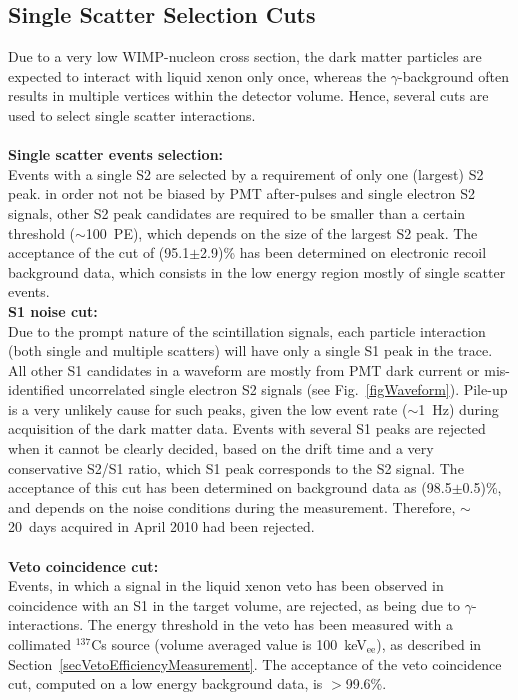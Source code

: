 \subsection{Single Scatter Selection Cuts}
\label{secSingleScatterSelectionCuts}
Due to a very low WIMP-nucleon cross section, the dark matter particles are expected to interact with liquid xenon only once, whereas the $\gamma$-background often results in multiple vertices within the detector volume. Hence, several cuts are used to select single scatter interactions.
\\
\\
{\bf Single scatter events selection:}\\
Events with a single S2 are selected by a requirement of only one (largest) S2 peak. in order not not be biased by PMT after-pulses and single electron S2 signals, other S2 peak candidates are required to be smaller than a certain threshold ($\sim$100~PE), which depends on the size of the largest S2 peak. The acceptance of the cut of (95.1$\pm$2.9)\% has been determined on electronic recoil background data, which consists in the low energy region mostly of single scatter events.
\\
{\bf S1 noise cut:}\\
Due to the prompt nature of the scintillation signals, each particle interaction (both single and multiple scatters) will have only a single S1 peak in the trace. All other S1 candidates in a waveform are mostly from PMT dark current or mis-identified uncorrelated single electron S2 signals (see Fig.~\ref{figWaveform}). Pile-up is a very unlikely cause for such peaks, given the low event rate ($\sim$1~Hz) during acquisition of the dark matter data. Events with several S1 peaks are rejected when it cannot be clearly  decided, based on the drift time and a very conservative S2/S1 ratio, which S1 peak corresponds to the S2 signal. The acceptance of this cut has been determined on background data as (98.5$\pm$0.5)\%, and depends on the noise conditions during the measurement. Therefore, $\sim$20~days acquired in April 2010 had been rejected.
\\
\\
{\bf Veto coincidence cut:}\\
Events, in which a signal in the liquid xenon veto has been observed in coincidence with an S1 in the target volume, are rejected, as being due to $\gamma$-interactions. The energy threshold in the veto has been measured with a collimated $^{137}$Cs source (volume averaged value is 100~keV$_{\mathrm{ee}}$), as described in Section~\ref{secVetoEfficiencyMeasurement}. The acceptance of the veto coincidence cut, computed on a low energy background data, is $>$99.6\%.



